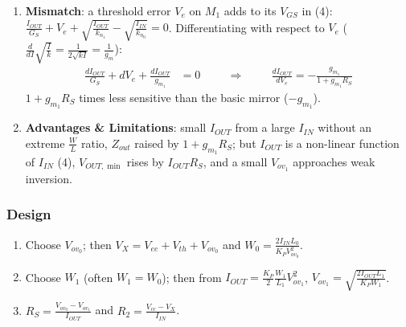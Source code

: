 \begin{enumerate}
    \paragraph{At Output:} \(I_{in} = 0 \Rightarrow V_x = 0\) by (5). Apply
      \(I_{test}\) at \(V_{out}\) (with \(G_3\) removed); it flows through
      \(M_1\) into \(G_S\): \(V_s = \frac{I_{test}}{G_S}\). From (6):
      \begin{align*}
        \frac{I_{test}}{G_S}(G_S + g_{m_1} + g_{o_1}) &= g_{o_1} V_{out} \\
        I_{test}\left(1 + \frac{g_{m_1} + g_{o_1}}{G_S}\right) &= g_{o_1} V_{out} \\
        Z_{out} = \frac{V_{out}}{I_{test}} &= \frac{1 + (g_{m_1} + g_{o_1}) R_S}{g_{o_1}} \\
                &= \frac{1}{g_{o_1}} + \frac{g_{m_1} R_S}{g_{o_1}} + \frac{g_{o_1} R_S}{g_{o_1}} \\
        Z_{out} &= r_{o_1} + g_{m_1} r_{o_1} R_S + R_S \approx r_{o_1}(1 + g_{m_1} R_S) \quad \text{[} R_S \ll r_{o_1} \text{]}
      \end{align*}
      The degeneration multiplies the basic mirror output impedance by
      \(1 + g_{m_1} R_S\).
  \item \textbf{Mismatch}: a threshold error \(V_e\) on \(M_1\) adds to its \(V_{GS}\) in (4):
    \(\frac{I_{OUT}}{G_S} + V_e + \sqrt{\frac{I_{OUT}}{k_{n_1}}} - \sqrt{\frac{I_{IN}}{k_{n_0}}} = 0\). Differentiating with respect to \(V_e\)
    (\(\frac{d}{dI}\sqrt{\frac{I}{k}} = \frac{1}{2\sqrt{kI}} = \frac{1}{g_m}\)):
    \begin{align*}
      \frac{dI_{OUT}}{G_S} + dV_e + \frac{dI_{OUT}}{g_{m_1}} &= 0 \hspace{1cm} \Rightarrow \hspace{1cm}
      \frac{dI_{OUT}}{dV_e} = -\frac{g_{m_1}}{1 + g_{m_1} R_S}
    \end{align*}
    \(1 + g_{m_1}R_S\) times less sensitive than the basic mirror (\(-g_{m_1}\)).
  \item \textbf{Advantages \& Limitations}: small \(I_{OUT}\) from a large \(I_{IN}\) without an extreme
    \(\frac{W}{L}\) ratio, \(Z_{out}\) raised by \(1 + g_{m_1} R_S\); but \(I_{OUT}\) is a non-linear function of
    \(I_{IN}\) (4), \(V_{OUT,\min}\) rises by \(I_{OUT} R_S\), and a small \(V_{ov_1}\) approaches weak inversion.
\end{enumerate}

\subsubsection{Design}
\begin{enumerate}
  \item Choose \(V_{ov_0}\); then \(V_X = V_{ee} + V_{th} + V_{ov_0}\) and
    \(W_0 = \frac{2 I_{IN} L_0}{K_P V_{ov_0}^2}\).
  \item Choose \(W_1\) (often \(W_1 = W_0\)); then from
    \(I_{OUT} = \frac{K_P}{2}\frac{W_1}{L_1} V_{ov_1}^2\),
    \(V_{ov_1} = \sqrt{\frac{2 I_{OUT} L_1}{K_P W_1}}\).
  \item \(R_S = \frac{V_{ov_0} - V_{ov_1}}{I_{OUT}}\) and
    \(R_2 = \frac{V_{cc} - V_X}{I_{IN}}\).
\end{enumerate}

